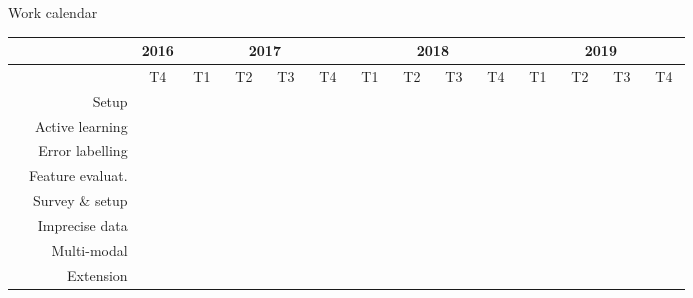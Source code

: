 \documentclass{beamer}
\begin{document}
\begin{frame}{Work calendar}
	\footnotesize
	\begin{table}
	\hspace*{-0.5cm}
	\setlength\tabcolsep{3pt} %
	\begin{tabular}{|c|r|ccc|cccccccccccc|cccccccccccc|cccccccccccc|}
		\hline
		& & \multicolumn{3}{c|}{2016} & \multicolumn{12}{c|}{2017} & \multicolumn{12}{c|}{2018}  & \multicolumn{12}{c|}{2019}  \\
		\hline	
		& & \multicolumn{3}{c|}{T4} & \multicolumn{3}{c|}{T1} & \multicolumn{3}{c|}{T2} & \multicolumn{3}{c|}{T3} & \multicolumn{3}{c|}{T4} & \multicolumn{3}{c|}{T1} & \multicolumn{3}{c|}{T2} & \multicolumn{3}{c|}{T3} & \multicolumn{3}{c|}{T4}  & \multicolumn{3}{c|}{T1} & \multicolumn{3}{c|}{T2} & \multicolumn{3}{c|}{T3} & \multicolumn{3}{c|}{T4}\\ 
		\hline
		& Setup & \cellcolor{black} & \cellcolor{black} & \cellcolor{black} & \cellcolor{black} & \cellcolor{black} & & & & & & & & & & & & & & & & & & & & & & & & & & & & & & & & & & \\
		\hdashline
		 \parbox[t]{2mm}{} & Active learning & & & & & &  &  &  &  & & & & & & & & & & & & & & & & & & & & & & & & & & & & & &\\
		& Error labelling & & & & & & & & & &  &  &  &  &  &  & & & & & & & & & & & & & & & & & & & & & & & & \\
		& Feature evaluat. & & & & & & & & & & & & & & & &  &  &  &  &  &  & & & & & & & & & & & & & & & & & & \\
		\hdashline
		 \parbox[t]{2mm}{} & Survey \& setup & & & & & & & & & & & & & & & & & & & & & &  & & & & & & & & & & & & & & & & & \\
		& Imprecise data & & & & & & & & & & & & & & & & & & & & & & &  &  &  &  &  &  &  & & & & & & & & & & \\
		& Multi-modal & & & & & & & & & & & & & & & & & & & & & & & & & & & & & &  &  &  &  &  &  & & & & \\
		\hdashline
		& Extension 
		& & & & & & & & & & & & & & & & & & & & & & & & & & & & & & & & & & & &  &  &  &  \\
		\hline 
	\end{tabular}



\end{table}
\end{frame}
\end{document}
